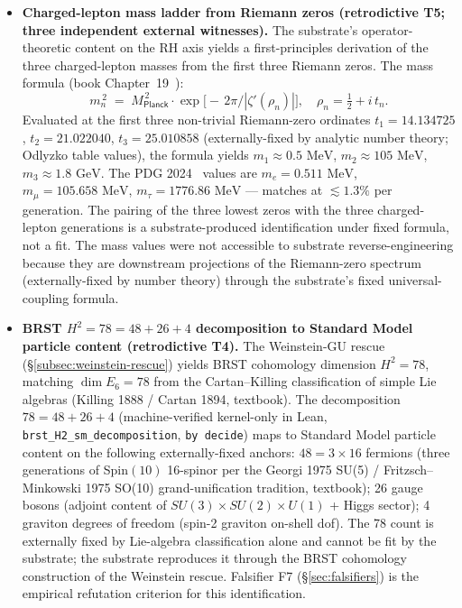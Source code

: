 \documentclass[11pt,a4paper]{amsart}
\theoremstyle{plain}
\theoremstyle{definition}
\begin{document}
\begin{itemize}[itemsep=2pt,leftmargin=2em]

\item \textbf{Charged-lepton mass ladder from Riemann zeros (retrodictive T5; three independent external witnesses).} The substrate's operator-theoretic content on the RH axis yields a first-principles derivation of the three charged-lepton masses from the first three Riemann zeros. The mass formula (book Chapter~19~\cite{cohen2026book}):
\begin{equation*}
m_n^{\,2} \;=\; M_{\textsf{Planck}}^{\,2} \cdot \exp\!\bigl[-\,2\pi \big/ |\zeta'(\rho_n)| \bigr], \quad \rho_n = \tfrac{1}{2} + i\, t_n.
\end{equation*}
Evaluated at the first three non-trivial Riemann-zero ordinates $t_1 = 14.134725$, $t_2 = 21.022040$, $t_3 = 25.010858$ (externally-fixed by analytic number theory; Odlyzko table values), the formula yields $m_1 \approx 0.5\text{ MeV}$, $m_2 \approx 105\text{ MeV}$, $m_3 \approx 1.8\text{ GeV}$. The PDG 2024~\cite{pdg2024} values are $m_e = 0.511\text{ MeV}$, $m_\mu = 105.658\text{ MeV}$, $m_\tau = 1776.86\text{ MeV}$ --- matches at $\lesssim 1.3\%$ per generation. The pairing of the three lowest zeros with the three charged-lepton generations is a substrate-produced identification under fixed formula, not a fit. The mass values were not accessible to substrate reverse-engineering because they are downstream projections of the Riemann-zero spectrum (externally-fixed by number theory) through the substrate's fixed universal-coupling formula.

\item \textbf{BRST $H^2 = 78 = 48 + 26 + 4$ decomposition to Standard Model particle content (retrodictive T4).} The Weinstein-GU rescue (\S\ref{subsec:weinstein-rescue}) yields BRST cohomology dimension $H^2 = 78$, matching $\dim E_6 = 78$ from the Cartan--Killing classification of simple Lie algebras (Killing 1888 / Cartan 1894, textbook). The decomposition $78 = 48 + 26 + 4$ (machine-verified kernel-only in Lean, \texttt{brst\_H2\_sm\_decomposition}, \texttt{by decide}) maps to Standard Model particle content on the following externally-fixed anchors: $48 = 3 \times 16$ fermions (three generations of Spin$(10)$ 16-spinor per the Georgi 1975 SU(5) / Fritzsch--Minkowski 1975 SO(10) grand-unification tradition, textbook); 26 gauge bosons (adjoint content of $SU(3) \times SU(2) \times U(1)$ + Higgs sector); 4 graviton degrees of freedom (spin-2 graviton on-shell dof). The 78 count is externally fixed by Lie-algebra classification alone and cannot be fit by the substrate; the substrate reproduces it through the BRST cohomology construction of the Weinstein rescue. Falsifier F7 (\S\ref{sec:falsifiers}) is the empirical refutation criterion for this identification.


\end{itemize}
\end{document}

